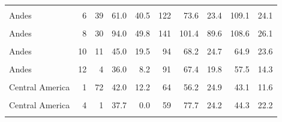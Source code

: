 \begin{ThreePartTable}
\begin{longtable}[t]{lrrrrrrrrr}
\cellcolor{gray!6}{Andes} & \cellcolor{gray!6}{5} & \cellcolor{gray!6}{68} & \cellcolor{gray!6}{69.0} & \cellcolor{gray!6}{59.8} & \cellcolor{gray!6}{114} & \cellcolor{gray!6}{78.7} & \cellcolor{gray!6}{16.1} & \cellcolor{gray!6}{135.4} & \cellcolor{gray!6}{30.0}\\
Andes & 6 & 39 & 61.0 & 40.5 & 122 & 73.6 & 23.4 & 109.1 & 24.1\\
\cellcolor{gray!6}{Andes} & \cellcolor{gray!6}{7} & \cellcolor{gray!6}{23} & \cellcolor{gray!6}{81.0} & \cellcolor{gray!6}{112.0} & \cellcolor{gray!6}{120} & \cellcolor{gray!6}{77.3} & \cellcolor{gray!6}{40.3} & \cellcolor{gray!6}{103.8} & \cellcolor{gray!6}{38.6}\\
Andes & 8 & 30 & 94.0 & 49.8 & 141 & 101.4 & 89.6 & 108.6 & 26.1\\
\cellcolor{gray!6}{Andes} & \cellcolor{gray!6}{9} & \cellcolor{gray!6}{45} & \cellcolor{gray!6}{61.0} & \cellcolor{gray!6}{57.0} & \cellcolor{gray!6}{130} & \cellcolor{gray!6}{74.6} & \cellcolor{gray!6}{56.3} & \cellcolor{gray!6}{111.6} & \cellcolor{gray!6}{25.8}\\
Andes & 10 & 11 & 45.0 & 19.5 & 94 & 68.2 & 24.7 & 64.9 & 23.6\\
\cellcolor{gray!6}{Andes} & \cellcolor{gray!6}{11} & \cellcolor{gray!6}{4} & \cellcolor{gray!6}{41.9} & \cellcolor{gray!6}{8.3} & \cellcolor{gray!6}{88} & \cellcolor{gray!6}{69.8} & \cellcolor{gray!6}{19.2} & \cellcolor{gray!6}{43.1} & \cellcolor{gray!6}{15.1}\\
Andes & 12 & 4 & 36.0 & 8.2 & 91 & 67.4 & 19.8 & 57.5 & 14.3\\
\cellcolor{gray!6}{Andes} & \cellcolor{gray!6}{13} & \cellcolor{gray!6}{36} & \cellcolor{gray!6}{71.0} & \cellcolor{gray!6}{7.0} & \cellcolor{gray!6}{88} & \cellcolor{gray!6}{74.0} & \cellcolor{gray!6}{21.2} & \cellcolor{gray!6}{96.6} & \cellcolor{gray!6}{39.6}\\
Central America & 1 & 72 & 42.0 & 12.2 & 64 & 56.2 & 24.9 & 43.1 & 11.6\\
\cellcolor{gray!6}{Central America} & \cellcolor{gray!6}{2} & \cellcolor{gray!6}{2} & \cellcolor{gray!6}{50.2} & \cellcolor{gray!6}{4.1} & \cellcolor{gray!6}{41} & \cellcolor{gray!6}{76.7} & \cellcolor{gray!6}{22.6} & \cellcolor{gray!6}{46.2} & \cellcolor{gray!6}{10.2}\\
Central America & 4 & 1 & 37.7 & 0.0 & 59 & 77.7 & 24.2 & 44.3 & 22.2\\
\cellcolor{gray!6}{Central America} & \cellcolor{gray!6}{5} & \cellcolor{gray!6}{41} & \cellcolor{gray!6}{34.7} & \cellcolor{gray!6}{6.6} & \cellcolor{gray!6}{39} & \cellcolor{gray!6}{82.6} & \cellcolor{gray!6}{25.7} & \cellcolor{gray!6}{37.4} & \cellcolor{gray!6}{10.6}\\

\end{longtable}
\end{ThreePartTable}
